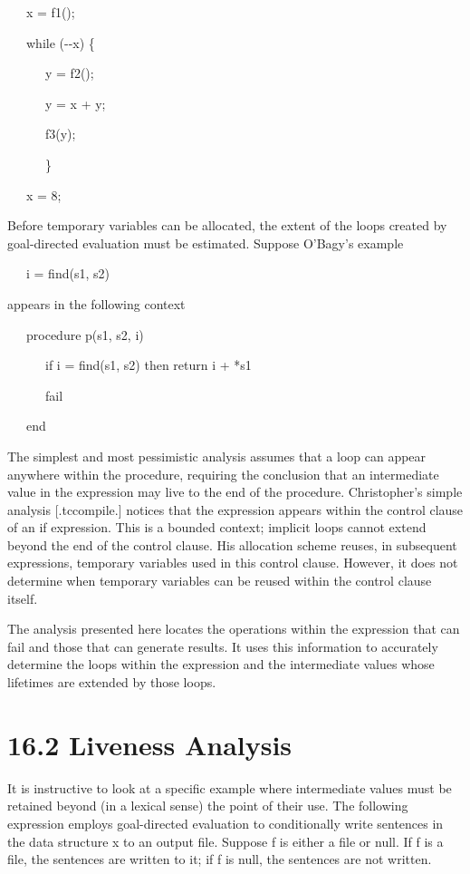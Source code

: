 {\ttfamily\mdseries
\ \ \ x = f1();}

{\ttfamily\mdseries
\ \ \ while (-{}-x) \{}

{\ttfamily\mdseries
\ \ \ \ \ \ y = f2();}

{\ttfamily\mdseries
\ \ \ \ \ \ y = x + y;}

{\ttfamily\mdseries
\ \ \ \ \ \ f3(y);}

{\ttfamily\mdseries
\ \ \ \ \ \ \}}

{\ttfamily\mdseries
\ \ \ x = 8;}

Before temporary variables can be allocated, the extent of the loops
created by goal-directed evaluation must be estimated. Suppose
O'Bagy's example

{\ttfamily\mdseries
\ \ \ i = find(s1, s2)}

\noindent
appears in the following context 

{\ttfamily\mdseries
\ \ \ procedure p(s1, s2, i)}

{\ttfamily\mdseries
\ \ \ \ \ \ if i = find(s1, s2) then return i + *s1}

{\ttfamily\mdseries
\ \ \ \ \ \ fail}

{\ttfamily\mdseries
\ \ \ end}


The simplest and most pessimistic analysis assumes that a loop can
appear anywhere within the procedure, requiring the conclusion that an
intermediate value in the expression may live to the end of the
procedure. Christopher's simple analysis [.tccompile.] notices that
the expression appears within the control clause of an if
expression. This is a bounded context; implicit loops cannot extend
beyond the end of the control clause. His allocation scheme reuses, in
subsequent expressions, temporary variables used in this control
clause. However, it does not determine when temporary variables can be
reused within the control clause itself.

The analysis presented here locates the operations within the
expression that can fail and those that can generate results. It uses
this information to accurately determine the loops within the
expression and the intermediate values whose lifetimes are extended by
those loops.


\section[16.2 Liveness Analysis]{16.2 Liveness Analysis}

It is instructive to look at a specific example where intermediate
values must be retained beyond (in a lexical sense) the point of their
use. The following expression employs goal-directed evaluation to
conditionally write sentences in the data structure x to an output
file. Suppose f is either a file or null. If f is a file, the
sentences are written to it; if f is null, the sentences are not
written.

